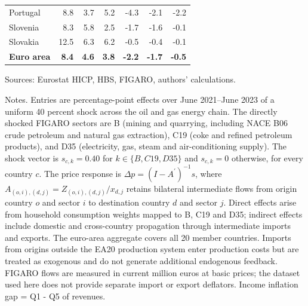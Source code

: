 \begin{table}[H]
\begin{tabular}{lrrrrrr}
 \\
Portugal & 8.8 & 3.7 & 5.2 & -4.3 & -2.1 & -2.2
 \\
Slovenia & 8.3 & 5.8 & 2.5 & -1.7 & -1.6 & -0.1
 \\
Slovakia & 12.5 & 6.3 & 6.2 & -0.5 & -0.4 & -0.1
 \\
\midrule
\textbf{Euro area} & \textbf{8.4} & \textbf{4.6} & \textbf{3.8} & \textbf{-2.2} & \textbf{-1.7} & \textbf{-0.5}
 \\
\bottomrule
\end{tabular}
\par\vspace{0.35em}\footnotesize\noindent Sources: Eurostat HICP, HBS, FIGARO, authors' calculations.
\par\vspace{0.25em}\footnotesize\noindent Notes. Entries are percentage-point effects over June 2021--June 2023 of a uniform 40 percent shock across the oil and gas energy chain. The directly shocked FIGARO sectors are B (mining and quarrying, including NACE B06 crude petroleum and natural gas extraction), C19 (coke and refined petroleum products), and D35 (electricity, gas, steam and air-conditioning supply). The shock vector is $s_{c,k}=0.40$ for $k\in\{B,C19,D35\}$ and $s_{c,k}=0$ otherwise, for every country $c$. The price response is $\Delta p = (I - A^{\prime})^{-1}s$, where $A_{(o,i),(d,j)}=Z_{(o,i),(d,j)}/x_{d,j}$ retains bilateral intermediate flows from origin country $o$ and sector $i$ to destination country $d$ and sector $j$. Direct effects arise from household consumption weights mapped to B, C19 and D35; indirect effects include domestic and cross-country propagation through intermediate imports and exports. The euro-area aggregate covers all 20 member countries. Imports from origins outside the EA20 production system enter production costs but are treated as exogenous and do not generate additional endogenous feedback. FIGARO flows are measured in current million euros at basic prices; the dataset used here does not provide separate import or export deflators. Income inflation gap = Q1 - Q5 of revenues.
\end{table}
\vspace{0.6em}

